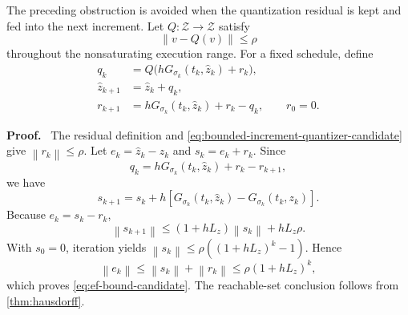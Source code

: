 \documentclass[twoside,11pt]{article}
\renewenvironment{proof}[1][Proof]{\par\noindent\textbf{#1.}\ }{\hfill\BlackBox\par\medskip}
\newcommand{\Z}{\mathcal{Z}}
\newcommand{\Rel}{\mathrm{rel}}
\newcommand{\norm}[1]{\left\lVert #1\right\rVert}
\newcommand{\RR}{\mathscr{R}}
\newcommand{\dH}{d_{\mathrm H}}
\begin{document}
The preceding obstruction is avoided when the quantization residual is kept
and fed into the next increment.  Let $Q:\Z\to\Z$ satisfy
\begin{equation}
  \norm{v-Q(v)}\le\rho
  \label{eq:bounded-increment-quantizer-candidate}
\end{equation}
throughout the nonsaturating execution range.  For a fixed schedule, define
\begin{align}
  q_k&=Q\bigl(hG_{\sigma_k}(t_k,\widehat z_k)+r_k\bigr),
  \label{eq:ef-quantize-candidate}\\
  \widehat z_{k+1}&=\widehat z_k+q_k,
  \label{eq:ef-state-candidate}\\
  r_{k+1}&=hG_{\sigma_k}(t_k,\widehat z_k)+r_k-q_k,
  \qquad r_0=0.
  \label{eq:ef-residual-candidate}
\end{align}


\begin{proof}
The residual definition and \eqref{eq:bounded-increment-quantizer-candidate}
give $\norm{r_k}\le\rho$.  Let
$e_k=\widehat z_k-z_k$ and $s_k=e_k+r_k$.  Since
\[
  q_k=hG_{\sigma_k}(t_k,\widehat z_k)+r_k-r_{k+1},
\]
we have
\[
  s_{k+1}
  =s_k+h\left[G_{\sigma_k}(t_k,\widehat z_k)
                   -G_{\sigma_k}(t_k,z_k)\right].
\]
Because $e_k=s_k-r_k$,
\[
  \norm{s_{k+1}}
  \le(1+hL_z)\norm{s_k}+hL_z\rho.
\]
With $s_0=0$, iteration yields
$\norm{s_k}\le\rho((1+hL_z)^k-1)$.  Hence
\[
  \norm{e_k}\le\norm{s_k}+\norm{r_k}
  \le\rho(1+hL_z)^k,
\]
which proves \eqref{eq:ef-bound-candidate}.  The reachable-set conclusion
follows from \cref{thm:hausdorff}.
\end{proof}
\end{document}
